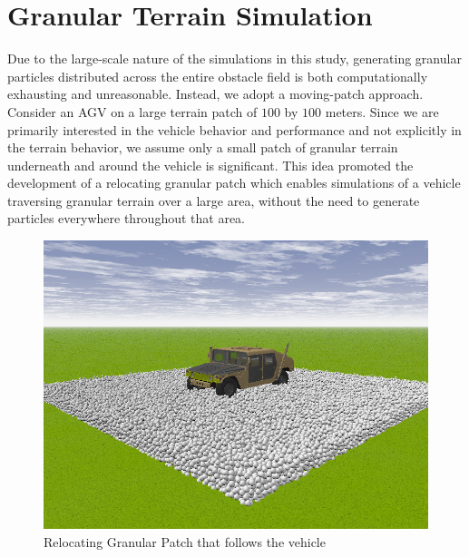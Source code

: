 \documentclass[12pt,onecolumn]{report}
\begin{document}

\section{Granular Terrain Simulation}\label{s:GranSim}

Due to the large-scale nature of the simulations in this study, generating granular particles distributed across the entire obstacle field is both computationally exhausting and unreasonable. Instead, we adopt a moving-patch approach. Consider an AGV on a large terrain patch of $100$ by $100$ meters. Since we are primarily interested in the vehicle behavior and performance and not explicitly in the terrain behavior, we assume only a small patch of granular terrain underneath and around the vehicle is significant. This idea promoted the development of a relocating granular patch which enables simulations of a vehicle traversing granular terrain over a large area, without the need to generate particles everywhere throughout that area. 

\begin{figure}
	\centering
	\includegraphics[width=0.8\columnwidth]{Figs/granPatch.png}
	\caption{\small Relocating Granular Patch that follows the vehicle}  
	\label{fig:granPatch}
\end{figure}
\end{document}
